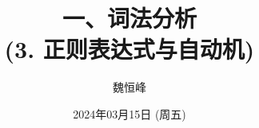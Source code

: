 \documentclass[]{beamer}
\title[词法分析]{一、词法分析 \\ (3. 正则表达式与自动机)}
\author[魏恒峰]{\large 魏恒峰}
\institute{hfwei@nju.edu.cn}
\date{2024年03月15日 (周五)}
\begin{document}
\maketitle













\thankyou{}

\end{document}
